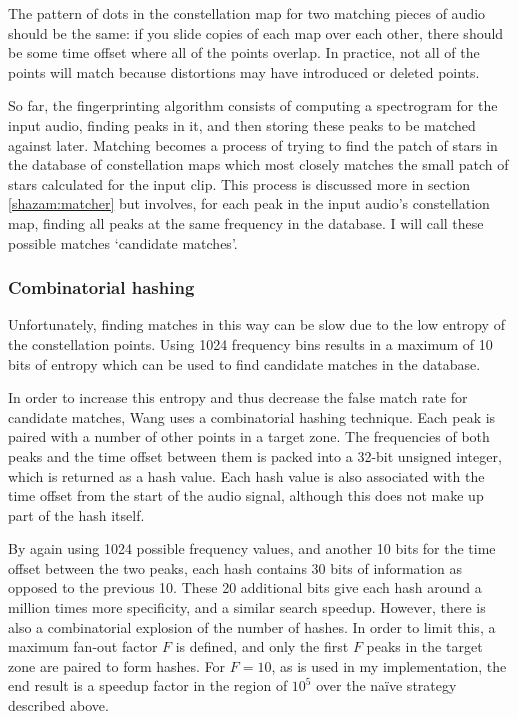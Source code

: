 \documentclass[12pt,a4paper,twoside,openright]{report}
\begin{document}
The pattern of dots in the constellation map for two matching pieces of audio should be the same: if you slide copies of each map over each other, there should be some time offset where all of the points overlap. In practice, not all of the points will match because distortions may have introduced or deleted points.

So far, the fingerprinting algorithm consists of computing a spectrogram for the input audio, finding peaks in it, and then storing these peaks to be matched against later. Matching becomes a process of trying to find the patch of stars in the database of constellation maps which most closely matches the small patch of stars calculated for the input clip. This process is discussed more in section \ref{shazam:matcher} but involves, for each peak in the input audio's constellation map, finding all peaks at the same frequency in the database. I will call these possible matches `candidate matches'.

\subsubsection{Combinatorial hashing}

Unfortunately, finding matches in this way can be slow due to the low entropy of the constellation points. Using 1024 frequency bins results in a maximum of 10 bits of entropy which can be used to find candidate matches in the database. 

In order to increase this entropy and thus decrease the false match rate for candidate matches, Wang uses a combinatorial hashing technique. Each peak is paired with a number of other points in a target zone. The frequencies of both peaks and the time offset between them is packed into a 32-bit unsigned integer, which is returned as a hash value. Each hash value is also associated with the time offset from the start of the audio signal, although this does not make up part of the hash itself.

By again using 1024 possible frequency values, and another 10 bits for the time offset between the two peaks, each hash contains 30 bits of information as opposed to the previous 10. These 20 additional bits give each hash around a million times more specificity, and a similar search speedup. However, there is also a combinatorial explosion of the number of hashes. In order to limit this, a maximum fan-out factor $F$ is defined, and only the first $F$ peaks in the target zone are paired to form hashes. For $F=10$, as is used in my implementation, the end result is a speedup factor in the region of $10^5$ over the na{\"i}ve strategy described above.
\end{document}
